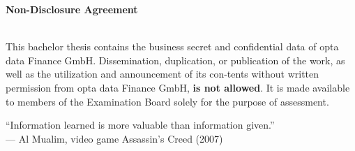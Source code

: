 \thispagestyle{empty} %

\begin{center}
    \Large\textbf{Non-Disclosure Agreement}
\end{center}
\noindent %
\\ This bachelor thesis contains the business secret and confidential data  of opta data Finance GmbH. Dissemination, duplication, or publication of the work, as well as the utilization and announcement of its con-tents without written permission from opta data Finance GmbH, \textbf{is not allowed}. It is made available to members of the Examination Board solely for the purpose of assessment.\\

                   \begin{center}
              \color{teal}
                        \large{“Information learned is more valuable than information given.”}\\
                      \color{black} 
                                                 {— Al Mualim, video game Assassin’s Creed (2007)}  
                   \end{center}